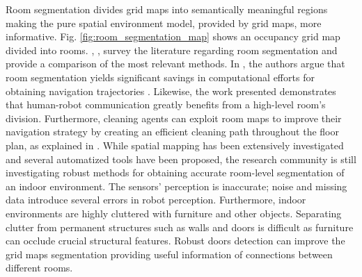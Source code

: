 Room segmentation divides grid maps into semantically meaningful regions making the pure spatial environment model, provided by grid maps, more informative. Fig. \ref{fig:room_segmentation_map} shows an occupancy grid map divided into rooms. \citeauthor{segmentationsurvey}, \cite{segmentationsurvey}, survey the literature regarding room segmentation and provide a comparison of the most relevant methods. In \cite{segmenationfornavigation}, the authors argue that room segmentation yields significant savings in computational efforts for obtaining navigation trajectories . Likewise, the work presented \cite{segmentationhumanrobot} demonstrates that human-robot communication greatly benefits from a high-level room's division. Furthermore, cleaning agents can exploit room maps to improve their navigation strategy by creating an efficient cleaning path throughout the floor plan, as explained in \cite{segmentationcleaning}. While spatial mapping has been extensively investigated and several automatized tools have been proposed, the research community is still investigating robust methods for obtaining accurate room-level segmentation of an indoor environment. The sensors' perception is inaccurate; noise and missing data introduce several errors in robot perception. Furthermore, indoor environments are highly cluttered with furniture and other objects. Separating clutter from permanent structures such as walls and doors is difficult as furniture can occlude crucial structural features. Robust doors detection can improve the grid maps segmentation providing useful information of connections between different rooms.

